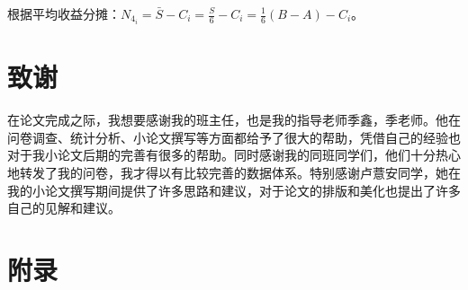 \documentclass[lang=cn,a4paper]{elegantpaper}
\begin{document}
    根据平均收益分摊：$\displaystyle N_{4_i}=\bar{S}-C_i=\frac{S}{6}-C_i=\frac{1}{6}(B-A)-C_i$。

    \section*{致谢}
    在论文完成之际，我想要感谢我的班主任，也是我的指导老师季鑫，季老师。他在问卷调查、统计分析、小论文撰写等方面都给予了很大的帮助，凭借自己的经验也对于我小论文后期的完善有很多的帮助。同时感谢我的同班同学们，他们十分热心地转发了我的问卷，我才得以有比较完善的数据体系。特别感谢卢薏安同学，她在我的小论文撰写期间提供了许多思路和建议，对于论文的排版和美化也提出了许多自己的见解和建议。
    
    \clearpage

    
    
    \clearpage
    
    \section*{附录}
    \appendix
\end{document}
